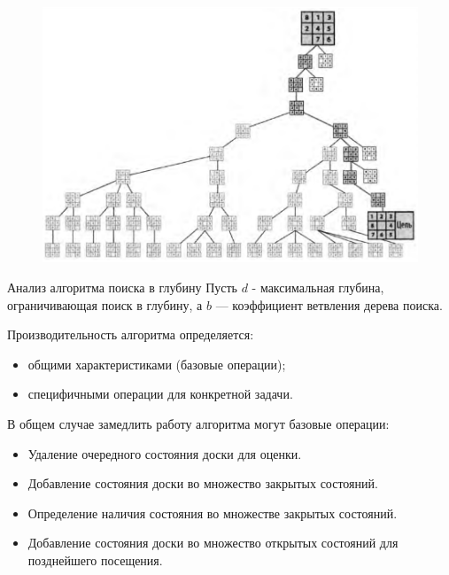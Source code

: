 \documentclass{beamer}
\begin{document}
\begin{frame}
\begin{figure}[h]
\centering
\includegraphics[scale=0.5]{images/lec06-pic03.png}
\end{figure}
\end{frame}

\begin{frame}{Анализ алгоритма поиска в глубину}
Пусть $d$ - максимальная глубина, ограничивающая поиск в глубину, а $b$ — коэффициент ветвления дерева поиска.

Производительность алгоритма определяется:
\begin{itemize}
\item общими характеристиками (базовые операции);
\item специфичными операции для конкретной задачи.
\end{itemize}

В общем случае замедлить работу алгоритма могут базовые операции:\begin{itemize}
\item Удаление очередного состояния доски для оценки.
\item Добавление состояния доски во множество закрытых состояний.
\item Определение наличия состояния во множестве закрытых состояний.
\item Добавление состояния доски во множество открытых состояний для позднейшего посещения.
\end{itemize}
\end{frame}
\end{document}
